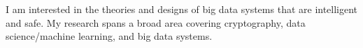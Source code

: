 \documentclass[letterpaper]{article}
\begin{document}

I am interested in the theories and designs of big data systems that are intelligent and safe. My research spans a broad area covering cryptography, data science/machine learning, and big data systems.  
\end{document}

